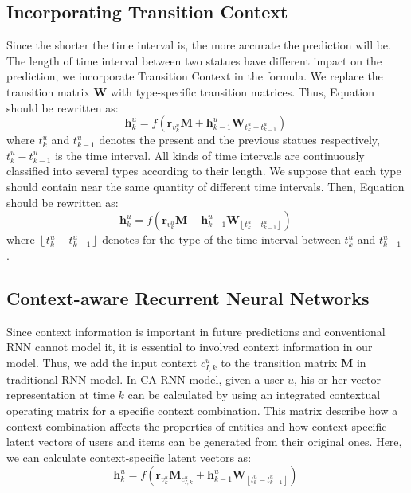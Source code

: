 \documentclass{sig-alternate}
\begin{document}
\subsection{ Incorporating Transition Context}
Since the shorter the time interval is, the more accurate the prediction will be. The length of time interval between two statues have different impact on the prediction, we incorporate Transition Context in the formula. We replace the transition matrix $\textbf{W}$ with type-specific transition matrices. Thus, Equation should be rewritten as: 
\begin{equation}
\textbf{h}_{k}^{u}=f\left ( \textbf{r}_{v_{k}^{u}}\textbf{M}+\textbf{h}_{k-1}^{u}\textbf{W}_{ t_k^u-t_{k-1}^u  }\right )
~\end{equation}
 where $t_k^u$ and $t_{k-1}^u$ denotes the present and the previous statues respectively, $t_k^u-t_{k-1}^u$ is the time interval.  All kinds of time intervals are continuously classified into several types according to their length. We suppose that each type should contain near the same quantity of different time intervals. Then, Equation should be rewritten as: 
\begin{equation}
\textbf{h}_{k}^{u}=f\left ( \textbf{r}_{v_{k}^{u}}\textbf{M}+\textbf{h}_{k-1}^{u}\textbf{W}_{\left\lfloor t_k^u-t_{k-1}^u \right\rfloor }\right )
~\end{equation}
where $\left\lfloor t_k^u-t_{k-1}^u \right\rfloor$ denotes for the type of the time interval between $t_k^u$ and $t_{k-1}^u$ .




\subsection{ Context-aware Recurrent Neural Networks}
Since context information is important in future predictions and conventional RNN cannot model it, it is essential to involved context information in our model. Thus, we add the input context $c_{I,k}^{u}$ to the transition matrix $\textbf{M}$ in traditional RNN model. In CA-RNN model, given a user $u$, his or her vector representation at time $k$ can be calculated by using an integrated contextual operating matrix for a specific context combination. This matrix describe how a context combination affects the properties of entities and how context-specific latent vectors of users and items can be generated from their original ones. Here, we can calculate context-specific latent vectors as: 
\begin{equation}
\textbf{h}_{k}^{u}=f\left ( \textbf{r}_{v_{k}^{u}}\textbf{M}_{c_{I,k}^{u}}+\textbf{h}_{k-1}^{u}\textbf{W}_{\left\lfloor t_k^u-t_{k-1}^u \right\rfloor }\right )
~
\end{equation}
\end{document}
